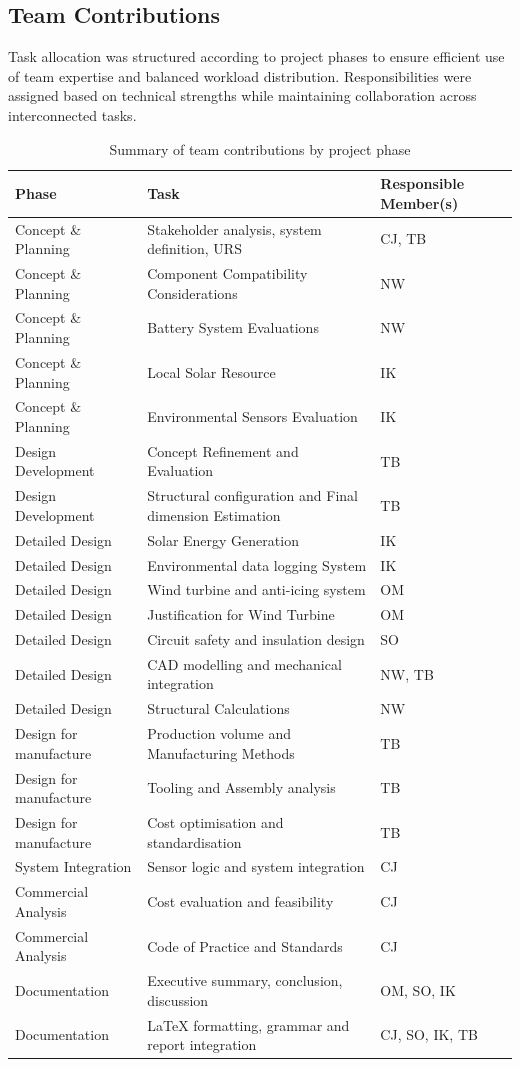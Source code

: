 \documentclass[11pt,a4paper]{article}
\begin{document}
\subsection{Team Contributions}

Task allocation was structured according to project phases to ensure efficient use of team expertise and balanced workload distribution. Responsibilities were assigned based on technical strengths while maintaining collaboration across interconnected tasks.

\begin{table}[H]
\centering
\caption{Summary of team contributions by project phase}
\begin{tabular}{lll}
\toprule
\textbf{Phase} & \textbf{Task} & \textbf{Responsible Member(s)} \\
\midrule
Concept \& Planning & Stakeholder analysis, system definition, URS & CJ, TB \\
Concept \& Planning & Component Compatibility Considerations & NW\\
Concept \& Planning & Battery System Evaluations & NW \\
Concept \& Planning & Local Solar Resource & IK \\
Concept \& Planning & Environmental Sensors Evaluation & IK \\
Design Development & Concept Refinement and Evaluation & TB \\
Design Development & Structural configuration and Final dimension Estimation & TB \\
Detailed Design & Solar Energy Generation & IK \\
Detailed Design & Environmental data logging System & IK \\

Detailed Design & Wind turbine and anti-icing system & OM \\
Detailed Design & Justification for Wind Turbine & OM \\
Detailed Design & Circuit safety and insulation design & SO \\
Detailed Design & CAD modelling and mechanical integration & NW, TB \\
Detailed Design & Structural Calculations & NW \\
Design for manufacture & Production volume and Manufacturing Methods & TB \\
Design for manufacture & Tooling and Assembly analysis & TB \\
Design for manufacture & Cost optimisation and standardisation & TB \\
System Integration & Sensor logic and system integration & CJ \\
Commercial Analysis & Cost evaluation and feasibility & CJ \\
Commercial Analysis & Code of Practice and Standards & CJ \\
Documentation & Executive summary, conclusion, discussion & OM, SO, IK \\
Documentation & LaTeX formatting, grammar and report integration & CJ, SO, IK, TB\\
\bottomrule
\end{tabular}
\end{table}
\end{document}
